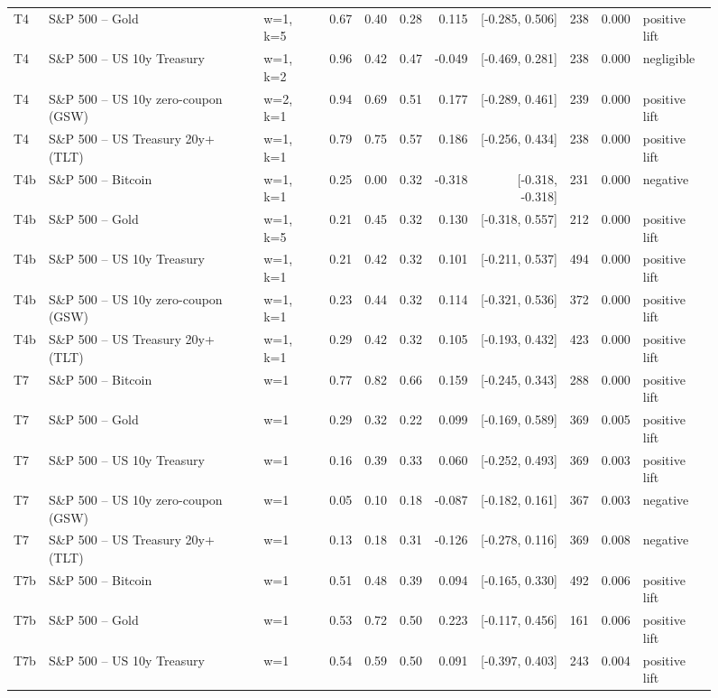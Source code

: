 \begin{figure}
\begin{tabular}{lllrrrrrrrl}
T4 & S\&P 500 -- Gold & w=1, k=5 & 0.67 & 0.40 & 0.28 & 0.115 & [-0.285, 0.506] & 238 & 0.000 & positive lift \\
T4 & S\&P 500 -- US 10y Treasury & w=1, k=2 & 0.96 & 0.42 & 0.47 & -0.049 & [-0.469, 0.281] & 238 & 0.000 & negligible \\
T4 & S\&P 500 -- US 10y zero-coupon (GSW) & w=2, k=1 & 0.94 & 0.69 & 0.51 & 0.177 & [-0.289, 0.461] & 239 & 0.000 & positive lift \\
T4 & S\&P 500 -- US Treasury 20y+ (TLT) & w=1, k=1 & 0.79 & 0.75 & 0.57 & 0.186 & [-0.256, 0.434] & 238 & 0.000 & positive lift \\
T4b & S\&P 500 -- Bitcoin & w=1, k=1 & 0.25 & 0.00 & 0.32 & -0.318 & [-0.318, -0.318] & 231 & 0.000 & negative \\
T4b & S\&P 500 -- Gold & w=1, k=5 & 0.21 & 0.45 & 0.32 & 0.130 & [-0.318, 0.557] & 212 & 0.000 & positive lift \\
T4b & S\&P 500 -- US 10y Treasury & w=1, k=1 & 0.21 & 0.42 & 0.32 & 0.101 & [-0.211, 0.537] & 494 & 0.000 & positive lift \\
T4b & S\&P 500 -- US 10y zero-coupon (GSW) & w=1, k=1 & 0.23 & 0.44 & 0.32 & 0.114 & [-0.321, 0.536] & 372 & 0.000 & positive lift \\
T4b & S\&P 500 -- US Treasury 20y+ (TLT) & w=1, k=1 & 0.29 & 0.42 & 0.32 & 0.105 & [-0.193, 0.432] & 423 & 0.000 & positive lift \\
T7 & S\&P 500 -- Bitcoin & w=1 & 0.77 & 0.82 & 0.66 & 0.159 & [-0.245, 0.343] & 288 & 0.000 & positive lift \\
T7 & S\&P 500 -- Gold & w=1 & 0.29 & 0.32 & 0.22 & 0.099 & [-0.169, 0.589] & 369 & 0.005 & positive lift \\
T7 & S\&P 500 -- US 10y Treasury & w=1 & 0.16 & 0.39 & 0.33 & 0.060 & [-0.252, 0.493] & 369 & 0.003 & positive lift \\
T7 & S\&P 500 -- US 10y zero-coupon (GSW) & w=1 & 0.05 & 0.10 & 0.18 & -0.087 & [-0.182, 0.161] & 367 & 0.003 & negative \\
T7 & S\&P 500 -- US Treasury 20y+ (TLT) & w=1 & 0.13 & 0.18 & 0.31 & -0.126 & [-0.278, 0.116] & 369 & 0.008 & negative \\
T7b & S\&P 500 -- Bitcoin & w=1 & 0.51 & 0.48 & 0.39 & 0.094 & [-0.165, 0.330] & 492 & 0.006 & positive lift \\
T7b & S\&P 500 -- Gold & w=1 & 0.53 & 0.72 & 0.50 & 0.223 & [-0.117, 0.456] & 161 & 0.006 & positive lift \\
T7b & S\&P 500 -- US 10y Treasury & w=1 & 0.54 & 0.59 & 0.50 & 0.091 & [-0.397, 0.403] & 243 & 0.004 & positive lift \\

\end{tabular}
\end{figure}

